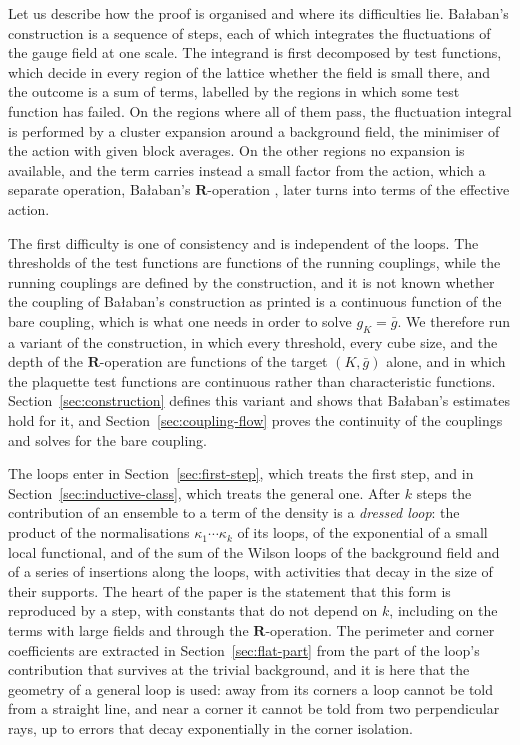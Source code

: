 \documentclass[11pt]{preprint}
\numberwithin{equation}{section}
\theoremstyle{definition}
\theoremstyle{remark}
\theoremstyle{plain}
\begin{document}
Let us describe how the proof is organised and where its difficulties lie. Ba{\l}aban's construction is a sequence of steps, each of which integrates the fluctuations of the gauge field at one scale. The integrand is first decomposed by test functions, which decide in every region of the lattice whether the field is small there, and the outcome is a sum of terms, labelled by the regions in which some test function has failed. On the regions where all of them pass, the fluctuation integral is performed by a cluster expansion around a background field, the minimiser of the action with given block averages. On the other regions no expansion is available, and the term carries instead a small factor from the action, which a separate operation, Ba{\l}aban's $\mathbf R$-operation \cite{BalabanLFR1,BalabanLFR2}, later turns into terms of the effective action.

The first difficulty is one of consistency and is independent of the loops. The thresholds of the test functions are functions of the running couplings, while the running couplings are defined by the construction, and it is not known whether the coupling of Ba{\l}aban's construction as printed is a continuous function of the bare coupling, which is what one needs in order to solve $g_K = \bar g$. We therefore run a variant of the construction, in which every threshold, every cube size, and the depth of the $\mathbf R$-operation are functions of the target $(K, \bar g)$ alone, and in which the plaquette test functions are continuous rather than characteristic functions. Section~\ref{sec:construction} defines this variant and shows that Ba{\l}aban's estimates hold for it, and Section~\ref{sec:coupling-flow} proves the continuity of the couplings and solves for the bare coupling.

The loops enter in Section~\ref{sec:first-step}, which treats the first step, and in Section~\ref{sec:inductive-class}, which treats the general one. After $k$ steps the contribution of an ensemble to a term of the density is a \emph{dressed loop}: the product of the normalisations $\kappa_1 \cdots \kappa_k$ of its loops, of the exponential of a small local functional, and of the sum of the Wilson loops of the background field and of a series of insertions along the loops, with activities that decay in the size of their supports. The heart of the paper is the statement that this form is reproduced by a step, with constants that do not depend on $k$, including on the terms with large fields and through the $\mathbf R$-operation. The perimeter and corner coefficients are extracted in Section~\ref{sec:flat-part} from the part of the loop's contribution that survives at the trivial background, and it is here that the geometry of a general loop is used: away from its corners a loop cannot be told from a straight line, and near a corner it cannot be told from two perpendicular rays, up to errors that decay exponentially in the corner isolation.
\end{document}
